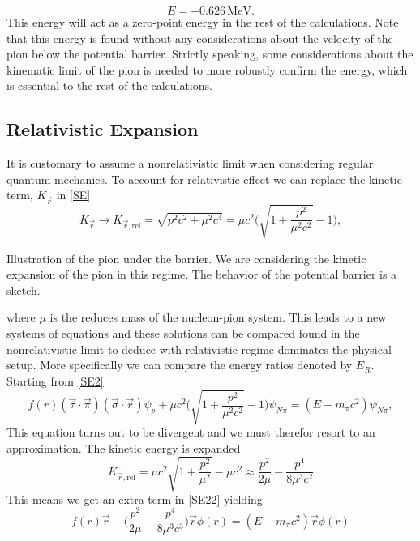 \begin{equation}
E = -0.626 \, \text{MeV}.
\end{equation}
This energy will act as a zero-point energy in the rest of the calculations. Note that this energy is found without any considerations about the velocity of the pion below the potential barrier. Strictly speaking, some considerations about the kinematic limit of the pion is needed to more robustly confirm the energy, which is essential to the rest of the calculations.
\subsection{Relativistic Expansion}
 It is customary to assume a nonrelativistic limit when considering regular quantum mechanics. To account for relativistic effect we can replace the kinetic term, $K_{\vec{r}}$ in \eqref{SE}
 \begin{equation}
     K_{\vec{r}}\rightarrow K_{\vec{r},\text{rel}} = \sqrt{p^2 c^2+\mu^2 c^4} = \mu c^2 \bigg(\sqrt{1+\frac{p^2}{\mu^2 c^2}}-1 \bigg),
 \end{equation}
\begin{marginfigure}
\centering

\caption{Illustration of the pion under the barrier. We are considering the kinetic expansion of the pion in this regime. The behavior of the potential barrier is a sketch.}
\label{fig:UnderBarrier}
\end{marginfigure}  
 where $\mu$ is the reduces mass of the nucleon-pion system. This leads to a new systems of equations and these solutions can be compared found in the nonrelativistic limit to deduce with relativistic regime dominates the physical setup. More specifically we can compare the energy ratios denoted by $E_R$. Starting from \eqref{SE2}
 \begin{equation}
     f(r) (\vec{\tau} \cdot \vec{\pi})(\vec{\sigma}\cdot \vec{r})\psi_p + \mu c^2 \bigg(\sqrt{1+\frac{p^2}{\mu^2 c^2}}-1 \bigg)\psi_{N\pi} = (E-m_{\pi}c^2)\psi_{N\pi},
 \end{equation}
 This equation turns out to be divergent and we must therefor resort to an approximation. The kinetic energy is expanded
 \begin{equation}
     K_{\vec{r},\text{rel}} = \mu c^2\sqrt{1+\frac{p^2}{\mu^2}}-\mu c^2 \approx \frac{p^2}{2\mu}-\frac{p^4}{8\mu^3 c^2}
 \end{equation}
 This means we get an extra term in \eqref{SE22} yielding
 \begin{equation}
     f(r)\vec{r}-\bigg( \frac{p^2}{2\mu}-\frac{p^4}{8\mu^3 c^3} \bigg)\vec{r}\phi(r) = (E-m_\pi c^2)\vec{r}\phi(r)
 \end{equation}
